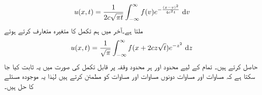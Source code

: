 \begin{align}\label{مساوات_جزوی_لامتناہی_سلاخ_حل_الف}
u(x,t)=\frac{1}{2c\sqrt{\pi t}}\int_{-\infty}^{\infty}f(v)e^{-\frac{(x-v)^2}{4c^2t}}\,\dif v
\end{align}
ملتا ہے۔آخر میں ہم تکمل کا متغیرہ  متعارف  کرتے ہوئے 
\begin{align}\label{مساوات_جزوی_لامتناہی_سلاخ_حل_ب}
u(x,t)=\frac{1}{\sqrt{\pi}}\int_{-\infty}^{\infty} f(x+2cz\sqrt{t})e^{-z^2}\,\dif z
\end{align}
حاصل کرتے ہیں۔ تمام  کے لیے محدود   اور ہر محدود وقفہ پر قابل تکمل  کی صورت میں  یہ ثابت کیا جا سکتا ہے کہ  مساوات  اور مساوات  دونوں  مساوات  اور مساوات  کو مطمئن کرتے ہیں لہٰذا یہ موجودہ مسئلے کا حل ہیں۔

